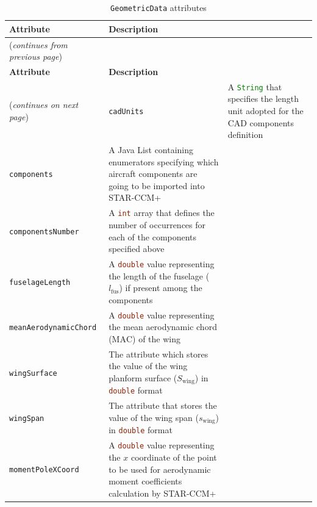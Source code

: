 \begin{longtable}[H]{p{3.8cm}p{10.7cm}}
\toprule
\textbf{Attribute} & \textbf{Description} \\
\midrule
\endfirsthead
%
{({\itshape continues from previous page})} & \\
\toprule
\textbf{Attribute} & \textbf{Description} \\
\midrule
\endhead
%
\midrule
{({\itshape continues on next page})} & 
\endfoot
%
\bottomrule
\caption{\lstinline[language=Java]!GeometricData! attributes}
\endlastfoot
%
\lstinline[language=Java]!cadUnits! & A \lstinline[language=Java]!String! that specifies the length unit adopted for the CAD components definition \\[0.2cm]
\lstinline[language=Java]!components! & A Java List containing enumerators specifying which aircraft components are going to be imported into STAR-CCM+ \\[0.2cm]
\lstinline[language=Java]!componentsNumber! & A \lstinline[language=Java]!int! array that defines the number of occurrences for each of the components specified above \\[0.2cm]
\lstinline[language=Java]!fuselageLength! & A \lstinline[language=Java]!double! value representing the length of the fuselage ($l_{\text{fus}}$) if present among the components \\[0.2cm]
\lstinline[language=Java]!meanAerodynamicChord! & A \lstinline[language=Java]!double! value representing the mean aerodynamic chord ($\text{MAC}$) of the wing \\[0.2cm]
\lstinline[language=Java]!wingSurface! & The attribute which stores the value of the wing planform surface ($S_{\text{wing}}$) in \lstinline[language=Java]!double! format \\[0.2cm]
\lstinline[language=Java]!wingSpan! & The attribute that stores the value of the wing span ($s_{\text{wing}}$) in \lstinline[language=Java]!double! format \\[0.2cm]
\lstinline[language=Java]!momentPoleXCoord! & A \lstinline[language=Java]!double! value representing the $x$ coordinate of the point to be used for aerodynamic moment coefficients calculation by STAR-CCM+
\label{tab:GeometricData}
\end{longtable}
\endgroup
%
\bigskip
